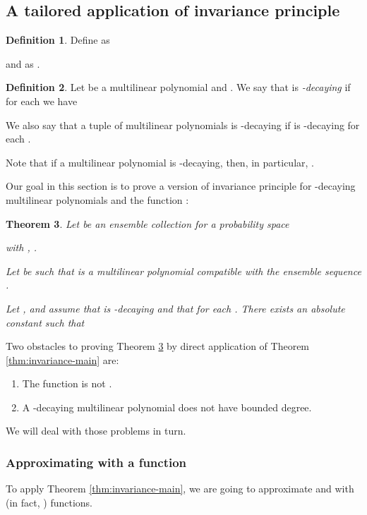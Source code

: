 \documentclass{daj}
\newcommand{\1}{\mathbbm{1}}
\theoremstyle{plain}
\newtheorem{theorem}{Theorem}[section]
\theoremstyle{definition}
\newtheorem{definition}[theorem]{Definition}
\begin{document}
\subsection{A tailored application of invariance principle}
\begin{definition}
\label{def:xi}
Define  as

and 
as .
\end{definition}

\begin{definition}
\label{def:gamma-smooth}
Let  be a multilinear polynomial and .
We say that  is \emph{-decaying} if
for each  we have


We also say that a tuple of multilinear polynomials
 is -decaying
if  is -decaying for each .
\end{definition}

Note that if a multilinear polynomial 
 is -decaying, then, in particular,
.

Our goal in this section is to prove a version of invariance principle
for -decaying multilinear polynomials and the function :
\begin{theorem}
\label{thm:invariance-smoothed}
Let  be an ensemble collection
for a probability space 

with , .

Let  be such that 
is a multilinear polynomial compatible with the ensemble sequence
.

Let ,  and assume that  is
-decaying and that  for each
. There exists an absolute constant  such that

\end{theorem}

Two obstacles to proving Theorem \ref{thm:invariance-smoothed}
by direct application of Theorem \ref{thm:invariance-main} are:
\begin{enumerate}
  \item The function  is not .
  \item A -decaying multilinear polynomial does not have bounded degree.
\end{enumerate}
We will deal with those problems in turn.

\subsubsection{Approximating
\texorpdfstring{}{chi}
with a 
\texorpdfstring{}{C\^{}3}
function}

To apply Theorem \ref{thm:invariance-main}, we are going
to approximate  and 
with 
(in fact, ) functions.
\end{document}

